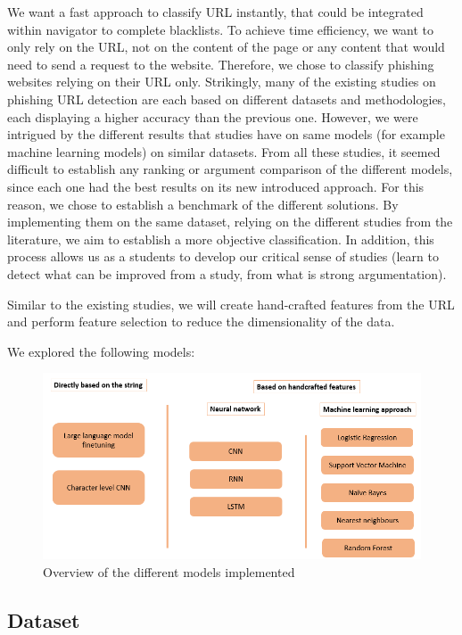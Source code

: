 \documentclass{article}
\begin{document}
    We want a fast approach to classify URL instantly, that could be integrated within navigator to complete blacklists.
    To achieve time efficiency, we want to only rely on the URL, not on the content of the page or any content that would need to send a request to the website.
    Therefore, we chose to classify phishing websites relying on their URL only.
    Strikingly, many of the existing studies on phishing URL detection are each based on different datasets and methodologies, each displaying a higher accuracy than the previous one.
    However, we were intrigued by the different results that studies have on same models (for example machine learning models) on similar datasets.
    From all these studies, it seemed difficult to establish any ranking or argument comparison of the different models, since each one had the best results on its new introduced approach.
    For this reason, we chose to establish a benchmark of the different solutions.
    By implementing them on the same dataset, relying on the different studies from the literature, we aim to establish a more objective classification.
    In addition, this process allows us as a students to develop our critical sense of studies (learn to detect what can be improved from a study, from what is strong argumentation).

    Similar to the existing studies, we will create hand-crafted features from the URL and perform feature selection to reduce the dimensionality of the data.

    We explored the following models:
    \begin{figure}[H]
        \centering
        \includegraphics[width=\linewidth]{report_img/modelspresentation}
        \caption{Overview of the different models implemented}
        \label{fig:model_presentation}
    \end{figure}

    \subsection{Dataset}\label{subsec:dataset}
\end{document}
